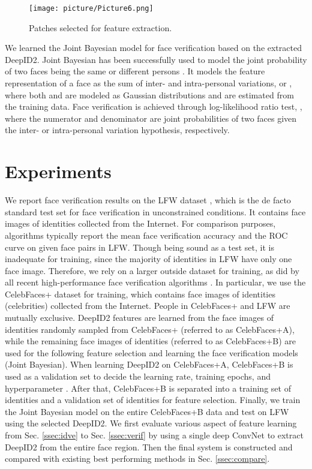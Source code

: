 \documentclass{article} \usepackage{nips14submit_e,times}
\begin{document}
\begin{figure}[t]
\begin{center}
\texttt{[image: picture/Picture6.png]}
\end{center}
\vspace{-0.1in}
\caption{Patches selected for feature extraction.}
\label{fig:patch}
\vspace{-0.0in}
\end{figure}

We learned the Joint Bayesian model \cite{chen2012} for face verification based on the extracted DeepID2. Joint Bayesian has been successfully used to model the joint probability of two faces being the same or different persons \cite{chen2012,chen2013}. It models the feature representation  of a face as the sum of inter- and intra-personal variations, or , where both  and  are modeled as Gaussian distributions and are estimated from the training data. Face verification is achieved through log-likelihood ratio test, , where the numerator and denominator are joint probabilities of two faces given the inter- or intra-personal variation hypothesis, respectively.


\section{Experiments}

We report face verification results on the LFW dataset \cite{huang2007}, which is the de facto standard test set for face verification in unconstrained conditions. It contains  face images of  identities collected from the Internet. For comparison purposes, algorithms typically report the mean face verification accuracy and the ROC curve on  given face pairs in LFW. Though being sound as a test set, it is inadequate for training, since the majority of identities in LFW have only one face image. Therefore, we rely on a larger outside dataset for training, as did by all recent high-performance face verification algorithms \cite{chen2013,cao2013,taigman2014,sun2014,lu2014}. In particular, we use the CelebFaces+ dataset \cite{sun2014} for training, which contains  face images of  identities (celebrities) collected from the Internet. People in CelebFaces+ and LFW are mutually exclusive. DeepID2 features are learned from the face images of  identities randomly sampled from CelebFaces+ (referred to as CelebFaces+A), while the remaining face images of  identities (referred to as CelebFaces+B) are used for the following feature selection and learning the face verification models (Joint Bayesian). When learning DeepID2 on CelebFaces+A, CelebFaces+B is used as a validation set to decide the learning rate, training epochs, and hyperparameter . After that, CelebFaces+B is separated into a training set of  identities and a validation set of  identities for feature selection. Finally, we train the Joint Bayesian model on the entire CelebFaces+B data and test on LFW using the selected DeepID2. We first evaluate various aspect of feature learning from Sec. \ref{ssec:idve} to Sec. \ref{ssec:verif} by using a single deep ConvNet to extract DeepID2 from the entire face region. Then the final system is constructed and compared with existing best performing methods in Sec. \ref{ssec:compare}.
\end{document}
